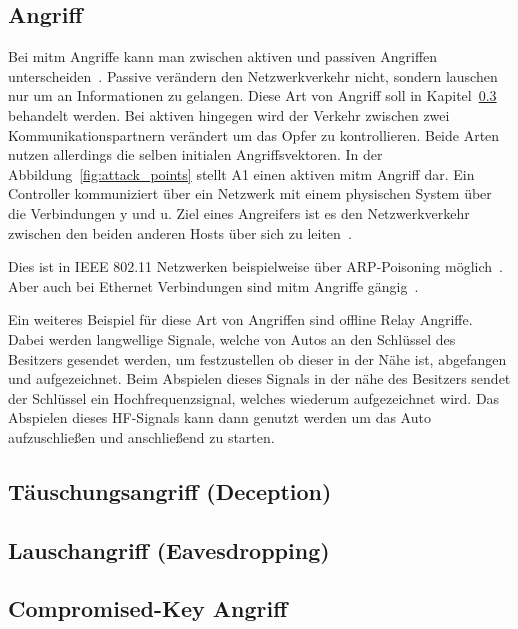 \subsection{ Angriff}\label{subsec:mitm}
Bei \gls{mitm} Angriffe kann man zwischen aktiven und passiven Angriffen unterscheiden~\cite{WYX+10}.%
Passive verändern den Netzwerkverkehr nicht, sondern lauschen nur um an Informationen zu gelangen.
Diese Art von Angriff soll in Kapitel~\ref{subsec:lauschen} behandelt werden.
Bei aktiven hingegen wird der Verkehr zwischen zwei Kommunikationspartnern verändert um das Opfer zu kontrollieren.
Beide Arten nutzen allerdings die selben initialen Angriffsvektoren.
In der Abbildung~\ref{fig:attack_points} stellt A1 einen aktiven \gls{mitm} Angriff dar.
Ein Controller kommuniziert über ein Netzwerk mit einem physischen System über die Verbindungen y und u.
Ziel eines Angreifers ist es den Netzwerkverkehr zwischen den beiden anderen Hosts über sich zu leiten~\cite{WYX+10,FPA+18}.

Dies ist in IEEE 802.11 Netzwerken beispielweise über ARP-Poisoning möglich~\cite{FIT+2012}.
Aber auch bei Ethernet Verbindungen sind \gls{mitm} Angriffe gängig~\cite{HLL+17}.

Ein weiteres Beispiel für diese Art von Angriffen sind offline Relay Angriffe.
Dabei werden langwellige Signale, welche von Autos an den Schlüssel des Besitzers gesendet werden, um festzustellen ob dieser in der Nähe ist, abgefangen und aufgezeichnet.
Beim Abspielen dieses Signals in der nähe des Besitzers sendet der Schlüssel ein Hochfrequenzsignal, welches wiederum aufgezeichnet wird.
Das Abspielen dieses HF-Signals kann dann genutzt werden um das Auto aufzuschließen und anschließend zu starten.~\cite{HLL+17}

\subsection{T\"auschungsangriff (Deception)}\label{subsec:tauschung} %
\subsection{Lauschangriff (Eavesdropping)}\label{subsec:lauschen} %
\subsection{Compromised-Key Angriff}\label{subsec:key}
